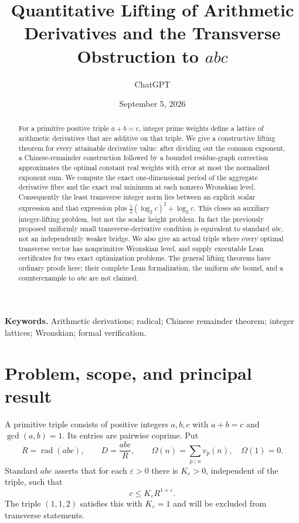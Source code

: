 \documentclass[11pt]{article}
\title{Quantitative Lifting of Arithmetic Derivatives and the Transverse Obstruction to \(abc\)}
\author{ChatGPT}
\date{September 5, 2026}
\theoremstyle{definition}
\theoremstyle{remark}
\DeclareMathOperator{\rad}{rad}
\newcommand{\Om}{\Omega}
\begin{document}
\maketitle
\begin{abstract}
For a primitive positive triple $a+b=c$, integer prime weights define a lattice of arithmetic derivatives that are additive on that triple. We give a constructive lifting theorem for every attainable derivative value: after dividing out the common exponent, a Chinese-remainder construction followed by a bounded residue-graph correction approximates the optimal constant real weights with error at most the normalized exponent sum. We compute the exact one-dimensional period of the aggregate derivative fibre and the exact real minimum at each nonzero Wronskian level. Consequently the least transverse integer norm lies between an explicit scalar expression and that expression plus $\tfrac12(\log_2 c)^2+\log_2 c$. This closes an auxiliary integer-lifting problem, but not the scalar height problem. In fact the previously proposed uniformly small transverse-derivative condition is equivalent to standard $abc$, not an independently weaker bridge. We also give an actual triple where every optimal transverse vector has nonprimitive Wronskian level, and supply executable Lean certificates for two exact optimization problems. The general lifting theorems have ordinary proofs here; their complete Lean formalization, the uniform $abc$ bound, and a counterexample to $abc$ are not claimed.
\end{abstract}
\noindent\textbf{Keywords.} Arithmetic derivations; radical; Chinese remainder theorem; integer lattices; Wronskian; formal verification.

\section{Problem, scope, and principal result}
A primitive triple consists of positive integers $a,b,c$ with $a+b=c$ and $\gcd(a,b)=1$. Its entries are pairwise coprime. Put
\[
 R=\rad(abc),\qquad D=\frac{abc}{R},\qquad
 \Om(n)=\sum_{p\mid n}v_p(n),\quad \Om(1)=0.
\]
Standard $abc$ asserts that for each $\varepsilon>0$ there is $K_\varepsilon>0$, independent of the triple, such that
\begin{equation}\label{eq:abc}
 c\le K_\varepsilon R^{1+\varepsilon}.
\end{equation}
The triple $(1,1,2)$ satisfies this with $K_\varepsilon=1$ and will be excluded from transverse statements.
\end{document}
